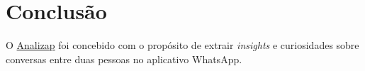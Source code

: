 \chapter{Conclusão}

O \href{https://analizap.tk}{Analizap} foi concebido com o propósito de extrair \textit{insights} e curiosidades sobre conversas entre duas pessoas no aplicativo WhatsApp.